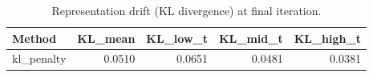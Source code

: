 \begin{table}[htbp]
\centering
\caption{Representation drift (KL divergence) at final iteration.}
\label{tab:repr_drift}
\begin{tabular}{lrrrr}
\toprule
\textbf{Method} & \textbf{KL\_mean} & \textbf{KL\_low\_t} & \textbf{KL\_mid\_t} & \textbf{KL\_high\_t} \\
\midrule
kl\_penalty & 0.0510 & 0.0651 & 0.0481 & 0.0381 \\
\bottomrule
\end{tabular}
\end{table}